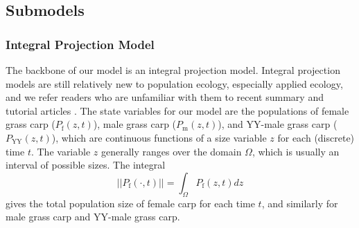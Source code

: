 \documentclass{article}[12pt]
\begin{document}
\subsection{Submodels}\label{sec:submdl}

\subsubsection{Integral Projection Model}

The backbone of our model is an integral projection model.
Integral projection models are still relatively new to population ecology, especially applied ecology, and we refer readers who are unfamiliar with them to recent summary and tutorial articles \citep[e.g.,][]{ellner2006integral, ramula2009integral, merow2014advancing}. The state variables for our model are the populations of female grass carp (\(P_\text{f}(z,t)\)), male grass carp (\(P_\text{m}(z, t)\)), and YY-male grass carp (\(P_\text{YY}(z, t)\)), which are continuous functions of a size variable \(z\) for each (discrete) time \(t\).  The variable \(z\) generally ranges over the domain \(\Omega\), which is usually an interval of possible sizes.  The integral
\begin{equation*}
||P_{\text{f}}(\cdot, t)|| = \int_{\Omega}P_{\text{f}}(z, t) dz
\end{equation*}
gives the total population size of female carp for each time \(t\), and similarly for male grass carp and YY-male grass carp. 
\end{document}
